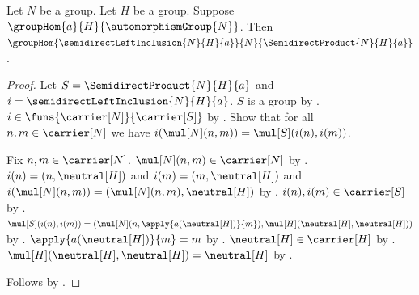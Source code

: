 \begin{theorem}\label{semidirect_left_inclusion_hom}
    Let $N$ be a group.
    Let $H$ be a group.
    Suppose $\groupHom{a}{H}{\automorphismGroup{N}}$.
    Then
        $\groupHom{\semidirectLeftInclusion{N}{H}{a}}
            {N}{\SemidirectProduct{N}{H}{a}}$.
\end{theorem}
\begin{proof}
    Let $S=\SemidirectProduct{N}{H}{a}$ and
        $i=\semidirectLeftInclusion{N}{H}{a}$.
    $S$ is a group by .
    $i\in\funs{\carrier[N]}{\carrier[S]}$ by
        .
    Show that for all $n,m\in\carrier[N]$ we have
        $i(\mul[N](n,m))=\mul[S](i(n),i(m))$.
    \begin{subproof}
        Fix $n,m\in\carrier[N]$.
        $\mul[N](n,m)\in\carrier[N]$ by
            .
        $i(n)=(n,\neutral[H])$ and
            $i(m)=(m,\neutral[H])$ and
            $i(\mul[N](n,m))=(\mul[N](n,m),\neutral[H])$ by
            .
        $i(n),i(m)\in\carrier[S]$ by
            .
        $\mul[S](i(n),i(m))=
            (\mul[N](n,\apply{a(\neutral[H])}{m}),
             \mul[H](\neutral[H],\neutral[H]))$ by
            .
        $\apply{a(\neutral[H])}{m}=m$ by
            .
        $\neutral[H]\in\carrier[H]$ by
            .
        $\mul[H](\neutral[H],\neutral[H])=\neutral[H]$ by
            .
    \end{subproof}
    Follows by .
\end{proof}


